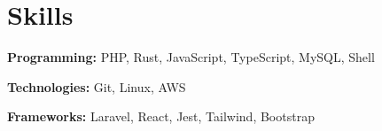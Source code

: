 \documentclass[letterpaper,11pt]{article}
\newcommand{\resumeSubHeadingListStart}{\begin{itemize}[leftmargin=0.15in, label={}]}
\newcommand{\resumeSubHeadingListEnd}{\end{itemize}}
\begin{document}
\section{Skills}
  \vspace{2pt}
  \resumeSubHeadingListStart{}
    \small{\item{%
        \textbf{Programming:} {PHP, Rust, JavaScript, TypeScript, MySQL, Shell} \\ \vspace{3pt}

        \textbf{Technologies:} {Git, Linux, AWS} \\ \vspace{3pt}

        \textbf{Frameworks:} {Laravel, React, Jest, Tailwind, Bootstrap} \\ \vspace{3pt}

    }}
  \resumeSubHeadingListEnd{}




%




\end{document}
